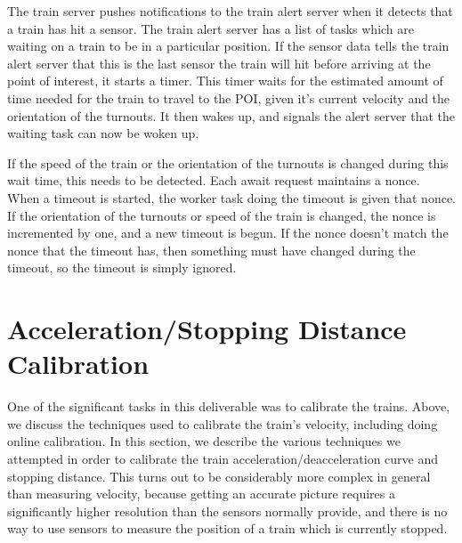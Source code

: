 \documentclass[titlepage]{article}
\begin{document}
The train server pushes notifications to the train alert server when
it detects that a train has hit a sensor.
The train alert server has a list of tasks which are waiting on a train
to be in a particular position.
If the sensor data tells the train alert server that this is the last
sensor the train will hit before arriving at the point of interest,
it starts a timer.
This timer waits for the estimated amount of time needed for the train
to travel to the POI, given it's current velocity and the orientation
of the turnouts.
It then wakes up, and signals the alert server that the waiting task can
now be woken up.

If the speed of the train or the orientation of the turnouts is changed
during this wait time, this needs to be detected.
Each await request maintains a nonce.
When a timeout is started, the worker task doing the timeout is given
that nonce.
If the orientation of the turnouts or speed of the train is changed,
the nonce is incremented by one, and a new timeout is begun.
If the nonce doesn't match the nonce that the timeout has, then something
must have changed during the timeout, so the timeout is simply ignored.



\section{Acceleration/Stopping Distance Calibration}
One of the significant tasks in this deliverable was to calibrate the trains.
Above, we discuss the techniques used to calibrate the train's velocity,
including doing online calibration. In this section, we describe the various
techniques we attempted in order to calibrate the train
acceleration/deacceleration curve and stopping distance. This turns out to be
considerably more complex in general than measuring velocity, because getting
an accurate picture requires a significantly higher resolution than the sensors
normally provide, and there is no way to use sensors to measure the position of
a train which is currently stopped.
\end{document}
